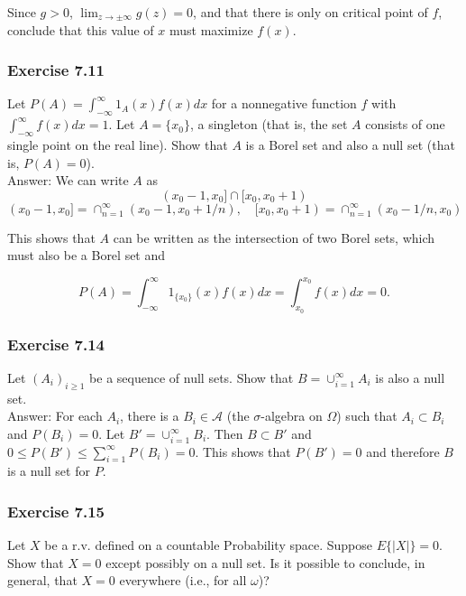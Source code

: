\documentclass{article}
\begin{document}
{Since $g > 0$, $\lim_{z \rightarrow \pm \infty}  g(z) = 0$, and that there is only on critical point of $f$, conclude that this value of $x$ must maximize $f(x)$. 

\subsubsection*{Exercise 7.11}

Let $P(A) = \int_{-\infty}^\infty 1_{A}(x)f(x)dx$ for a nonnegative function $f$ with $\int_{-\infty}^\infty f(x)dx = 1$. Let $A = \{x_0\}$, a singleton (that is, the set $A$ consists of one single point on the real line). Show that $A$ is a Borel set and also a null set (that is, $P(A) = 0$). \\

Answer: We can write $A$ as 
$$
(x_0 - 1, x_0] \cap [x_0, x_0 + 1)
$$
$$
(x_0 - 1, x_0] = \cap_{n=1}^\infty (x_0 - 1, x_0 + 1/n),\quad [x_0, x_0 + 1) = \cap_{n=1}^\infty (x_0 - 1/n, x_0)$$

This shows that $A$ can be written as the intersection of two Borel sets, which must also be a Borel set and

$$
P(A) = \int_{-\infty}^\infty 1_{\{x_0\}}(x)f(x) dx = \int_{x_0}^{x_0} f(x) dx = 0 .
$$ 

\subsubsection*{Exercise 7.14}

Let $(A_i)_{i\geq 1}$ be a sequence of null sets. Show that $B = \cup_{i=1}^\infty A_i$ is also a null set.\\

Answer: For each $A_i$, there is a $B_i \in \mathcal{A}$ (the $\sigma$-algebra on $\Omega$) such that $A_i \subset B_i$ and $P(B_i) = 0$. Let $B' = \cup_{i=1}^\infty B_i$. Then $B \subset B'$ and $0 \leq P(B') \leq \sum_{i=1}^\infty P(B_i) = 0$. This shows that $P(B') = 0$ and therefore $B$ is a null set for $P$.  

\subsubsection*{Exercise 7.15}

Let $X$ be a r.v. defined on a countable Probability space. Suppose $E\{|X|\} = 0$. Show that $X = 0$ except possibly on a null set. Is it possible to conclude, in general, that $X = 0$ everywhere (i.e., for all $\omega$)? \\

}
\end{document}

